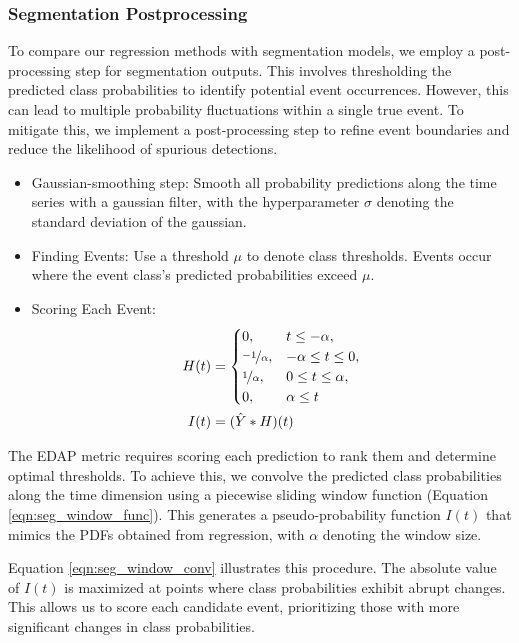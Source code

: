 \documentclass{article}
\begin{document}
\subsubsection{Segmentation Postprocessing}

To compare our regression methods with segmentation models, we employ a post-processing step for segmentation outputs. This involves thresholding the predicted class probabilities to identify potential event occurrences. However, this can lead to multiple probability fluctuations within a single true event. To mitigate this, we implement a post-processing step to refine event boundaries and reduce the likelihood of spurious detections.

\begin{itemize}
  \item Gaussian-smoothing step:
Smooth all probability predictions along the time series with a gaussian filter, with the hyperparameter $\sigma$ denoting the standard deviation of the gaussian.
  \item Finding Events: 
Use a threshold $\mu$ to denote class thresholds. Events occur where the event class’s predicted probabilities exceed $\mu$.  
  \item Scoring Each Event:
    \begin{align} 
    H(t) &= \begin{cases}  
    0, & t\leq -\alpha, \\
    \nicefrac{-1}{\alpha} ,& -\alpha\leq t\leq 0, \\
    \nicefrac{1}{\alpha} ,& 0\leq t\leq\alpha, \\
    0, & \alpha\leq t \\
    \end{cases} \label{eqn:seg_window_func} \\
    I(t) &= (\hat{Y} \ast H)(t) \label{eqn:seg_window_conv}
    \end{align}
\end{itemize}

The EDAP metric requires scoring each prediction to rank them and determine optimal thresholds. To achieve this, we convolve the predicted class probabilities along the time dimension using a piecewise sliding window function (Equation \ref{eqn:seg_window_func}). This generates a pseudo-probability function $I(t)$ that mimics the PDFs obtained from regression, with $\alpha$ denoting the window size. 

Equation \ref{eqn:seg_window_conv} illustrates this procedure. The absolute value of $I(t)$ is maximized at points where class probabilities exhibit abrupt changes. This allows us to score each candidate event, prioritizing those with more significant changes in class probabilities.
\end{document}
